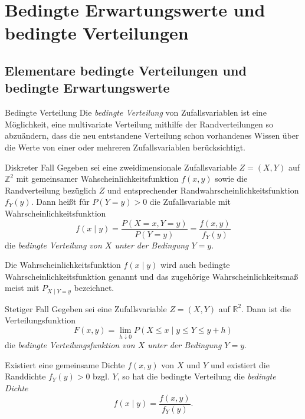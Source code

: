 \section{Bedingte Erwartungswerte und bedingte Verteilungen}

\subsection{Elementare bedingte Verteilungen und bedingte Erwartungswerte}

\begin{defi}{Bedingte Verteilung}
    Die \emph{bedingte Verteilung} von Zufallsvariablen ist eine Möglichkeit, eine multivariate Verteilung mithilfe der Randverteilungen so abzuändern, dass die neu entstandene Verteilung schon vorhandenes Wissen über die Werte von einer oder mehreren Zufallsvariablen berücksichtigt.
\end{defi}

\begin{defi}{Diskreter Fall}
    Gegeben sei eine zweidimensionale Zufallsvariable $Z = (X, Y)$ auf $\mathbb{Z}^2$ mit gemeinsamer Wahscheinlichkeitsfunktion $f(x, y)$ sowie die Randverteilung bezüglich $Z$ und entsprechender Randwahrscheinlichkeitsfunktion $f_Y(y)$.
    Dann heißt für $P(Y = y) > 0$ die Zufallsvariable mit Wahrscheinlichkeitsfunktion
    \[
        f(x \mid y) = \frac{P(X = x, Y = y)}{P(Y = y)} = \frac{f(x, y)}{f_Y(y)}
    \]
    die \emph{bedingte Verteilung von $X$ unter der Bedingung $Y = y$}.

    Die Wahrscheinlichkeitsfunktion $f(x \mid y)$ wird auch bedingte Wahrscheinlichkeitsfunktion genannt und das zugehörige Wahrscheinlichkeitsmaß meist mit $P_{X \mid Y=y}$ bezeichnet.
\end{defi}

\begin{bonus}{Stetiger Fall}
    Gegeben sei eine Zufallsvariable $Z = (X, Y)$ auf $\mathbb{R}^2$.
    Dann ist die Verteilungsfunktion
    \[
        F(x, y) = \lim_{h \downarrow 0} P(X \leq x \mid y \leq Y \leq y + h)
    \]
    die \emph{bedingte Verteilungsfunktion von $X$ unter der Bedingung $Y = y$}.

    Existiert eine gemeinsame Dichte $f(x, y)$ von $X$ und $Y$ und existiert die Randdichte $f_Y(y) > 0$ bzgl. $Y$, so hat die bedingte Verteilung die \emph{bedingte Dichte}
    \[
        f(x \mid y) = \frac{f(x, y)}{f_Y(y)}.
    \]
\end{bonus}

